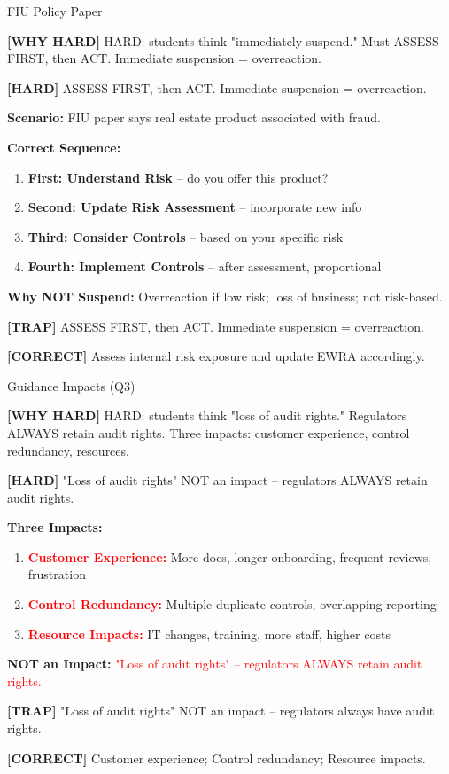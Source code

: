 \documentclass[6pt,aspectratio=169,fontsize=5pt]{beamer}
\renewcommand{\tiny}{\fontsize{3.5pt}{4.5pt}\selectfont}
\renewcommand{\normalsize}{\fontsize{7.5pt}{8.5pt}\selectfont}
\newcommand{\trap}[1]{%
	\begin{block}{\textcolor{redtrap}{\textbf{[TRAP]}}}
		\textcolor{redtrap}{\tiny #1}
	\end{block}
}
\newcommand{\correct}[1]{%
	\begin{block}{\textcolor{greencorrect}{\textbf{[CORRECT]}}}
		\textcolor{greencorrect}{\tiny #1}
	\end{block}
}
\newcommand{\hard}[1]{%
	\begin{block}{\textcolor{hardcolor}{\textbf{[HARD]}}}
		\textcolor{hardcolor}{\tiny #1}
	\end{block}
}
\newcommand{\hardexplain}[1]{%
	\begin{block}{\textcolor{orangehard}{\textbf{[WHY HARD]}}}
		\textcolor{orangehard}{\tiny #1}
	\end{block}
}
\begin{document}
	\begin{frame}{\normalsize FIU Policy Paper}
		
		\hardexplain{HARD: students think "immediately suspend." Must ASSESS FIRST, then ACT. Immediate suspension = overreaction.}
		
		\hard{ASSESS FIRST, then ACT. Immediate suspension = overreaction.}
		
		\textbf{Scenario:} FIU paper says real estate product associated with fraud.
		
		\textbf{Correct Sequence:}
		\begin{enumerate}
			\item \textbf{First: Understand Risk} -- do you offer this product?
			\item \textbf{Second: Update Risk Assessment} -- incorporate new info
			\item \textbf{Third: Consider Controls} -- based on your specific risk
			\item \textbf{Fourth: Implement Controls} -- after assessment, proportional
		\end{enumerate}
		
		\textbf{Why NOT Suspend:} Overreaction if low risk; loss of business; not risk-based.
		
		\trap{ASSESS FIRST, then ACT. Immediate suspension = overreaction.}
		
		\correct{Assess internal risk exposure and update EWRA accordingly.}
	\end{frame}
	
	\begin{frame}{\normalsize Guidance Impacts (Q3)}
		
		\hardexplain{HARD: students think "loss of audit rights." Regulators ALWAYS retain audit rights. Three impacts: customer experience, control redundancy, resources.}
		
		\hard{"Loss of audit rights" NOT an impact -- regulators ALWAYS retain audit rights.}
		
		\textbf{Three Impacts:}
		\begin{enumerate}
			\item \textcolor{red}{\textbf{Customer Experience:}} More docs, longer onboarding, frequent reviews, frustration
			\item \textcolor{red}{\textbf{Control Redundancy:}} Multiple duplicate controls, overlapping reporting
			\item \textcolor{red}{\textbf{Resource Impacts:}} IT changes, training, more staff, higher costs
		\end{enumerate}
		
		\textbf{NOT an Impact:} \textcolor{red}{"Loss of audit rights" -- regulators ALWAYS retain audit rights.}
		
		\trap{"Loss of audit rights" NOT an impact -- regulators always have audit rights.}
		
		\correct{Customer experience; Control redundancy; Resource impacts.}
	\end{frame}
	
\end{document}
